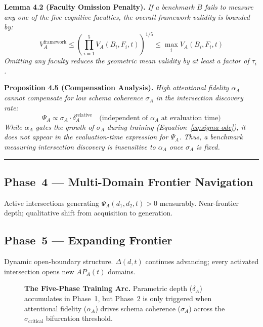 \documentclass[11pt,a4paper]{article}
\begin{document}
\textbf{Lemma 4.2 (Faculty Omission Penalty).}
\textit{If a benchmark $B$ fails to measure any one of the five cognitive
faculties, the overall framework validity is bounded by:
\begin{equation}\label{eq:omission-penalty}
V_A^{\text{framework}} \leq \left(\prod_{i=1}^{5} V_A(B_i, F_i, t)\right)^{1/5} \leq \max_i V_A(B_i, F_i, t)
\end{equation}
Omitting any faculty reduces the geometric mean validity by at least a
factor of $\tau_i$.}

\textbf{Proposition 4.5 (Compensation Analysis).}
\textit{High attentional fidelity $\alpha_A$ cannot compensate for low
schema coherence $\sigma_A$ in the intersection discovery rate:
\begin{equation}\label{eq:no-compensation}
\Psi_A \propto \sigma_A \cdot \delta_A^{\text{relative}} \quad \text{(independent of } \alpha_A \text{ at evaluation time)}
\end{equation}
While $\alpha_A$ gates the \textit{growth} of $\sigma_A$ during training
(Equation~\eqref{eq:sigma-ode}), it does not appear in the evaluation-time
expression for $\Psi_A$. Thus, a benchmark measuring intersection discovery
is insensitive to $\alpha_A$ once $\sigma_A$ is fixed.}

\noindent\rule{\linewidth}{0.4pt}

\subsection*{Phase~4 --- Multi-Domain Frontier Navigation}

Active intersections generating $\Psi_A(d_1,d_2,t) > 0$ measurably.
Near-frontier depth; qualitative shift from acquisition to generation.

\subsection*{Phase~5 --- Expanding Frontier}

Dynamic open-boundary structure. $\Delta(d,t)$ continues advancing;
every activated intersection opens new $AP_A(t)$ domains.

\begin{figure}[htbp]
\centering
\resizebox{\textwidth}{!}{}
\caption{\textbf{The Five-Phase Training Arc.} Parametric depth
($\delta_A$) accumulates in Phase~1, but Phase~2 is only triggered when
attentional fidelity ($\alpha_A$) drives schema coherence ($\sigma_A$)
across the $\sigma_{\text{critical}}$ bifurcation threshold.}
\label{fig:phases}
\end{figure}
\end{document}
